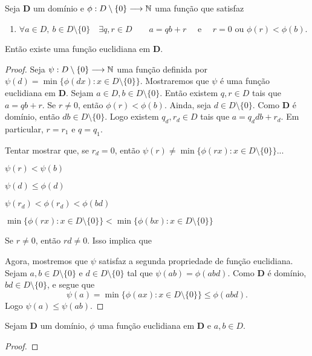 \begin{prop}
	Seja $\bm D$ um domínio e $\phi: D \setminus \{0\} \longrightarrow \mathbb{N}$ uma função que satisfaz
	\begin{enumerate}
	\item $\forall a \in D,\ b \in D \setminus \{0\} \quad \exists q,r \in D \qquad a=qb+r \quad \text{\ \ e\ \ }\quad r=0 \text{\ \ ou\ \ } \phi(r)<\phi(b)$.
	\end{enumerate}
	Então existe uma função euclidiana em $\bm D$.
\end{prop}
\begin{proof}
	Seja $\psi: D \setminus \{0\} \longrightarrow \mathbb{N}$ uma função definida por $\psi(d)=\min\{\phi(dx) : x \in D \setminus \{0\}\}$. Mostraremos que $\psi$ é uma função euclidiana em $\bm D$. Sejam $a \in D,b \in D \setminus \{0\}$. Então existem $q,r \in D$ tais que $a=qb+r$. Se $r \neq 0$, então $\phi(r) < \phi(b)$. Ainda, seja $d \in D \setminus \{0\}$.  Como $\bm D$ é domínio, então $db \in D \setminus \{0\}$. Logo existem $q_d,r_d \in D$ tais que $a=q_ddb+r_d$. Em particular, $r=r_1$ e $q=q_1$.

	Tentar mostrar que, se $r_d = 0$, então $\psi(r) \neq \min\{\phi(rx) : x \in D \setminus \{0\}\}$...

	$\psi(r) < \psi(b)$

	$\psi(d) \leq \phi(d)$

	$\psi(r_d) < \phi(r_d) < \phi(bd)$

	$\min\{\phi(rx) : x \in D \setminus \{0\}\} < \min\{\phi(bx) : x \in D \setminus \{0\}\}$

	Se $r \neq 0$, então $rd \neq 0$. Isso implica que

	Agora, mostremos que $\psi$ satisfaz a segunda propriedade de função euclidiana. Sejam $a,b \in D \setminus \{0\}$ e $d \in D \setminus \{0\}$ tal que $\psi(ab)=\phi(abd)$. Como $\bm D$ é domínio, $bd \in D \setminus \{0\}$, e segue que
	\begin{equation*}
	\psi(a) =  \min\{\phi(ax) : x \in D \setminus \{0\}\} \leq \phi(abd).
	\end{equation*}
Logo $\psi(a) \leq \psi(ab)$.

\end{proof}

\begin{prop}
	Sejam $\bm D$ um domínio, $\phi$ uma função euclidiana em $\bm D$ e $a,b \in D$.
\end{prop}
\begin{proof}

\end{proof}

